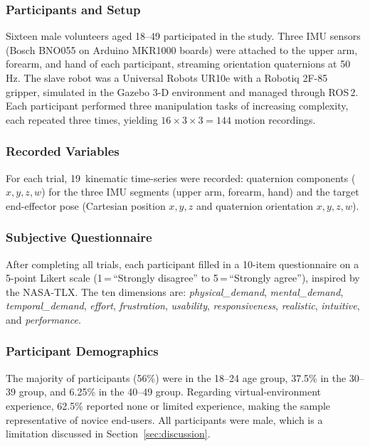 \subsubsection{Participants and Setup}

Sixteen male volunteers aged 18--49 participated in the study. Three IMU sensors (Bosch BNO055 on Arduino MKR1000 boards) were attached to the upper arm, forearm, and hand of each participant, streaming orientation quaternions at 50\,Hz. The slave robot was a Universal Robots UR10e with a Robotiq 2F-85 gripper, simulated in the Gazebo 3-D environment and managed through ROS\,2. Each participant performed three manipulation tasks of increasing complexity, each repeated three times, yielding $16 \times 3 \times 3 = 144$ motion recordings.

\subsubsection{Recorded Variables}

For each trial, 19~kinematic time-series were recorded: quaternion components ($x, y, z, w$) for the three IMU segments (upper arm, forearm, hand) and the target end-effector pose (Cartesian position $x, y, z$ and quaternion orientation $x, y, z, w$).

\subsubsection{Subjective Questionnaire}

After completing all trials, each participant filled in a 10-item questionnaire on a 5-point Likert scale (1\,=\,``Strongly disagree'' to 5\,=\,``Strongly agree''), inspired by the NASA-TLX. The ten dimensions are: \textit{physical\_demand}, \textit{mental\_demand}, \textit{temporal\_demand}, \textit{effort}, \textit{frustration}, \textit{usability}, \textit{responsiveness}, \textit{realistic}, \textit{intuitive}, and \textit{performance}.

\subsubsection{Participant Demographics}

The majority of participants (56\%) were in the 18--24 age group, 37.5\% in the 30--39 group, and 6.25\% in the 40--49 group. Regarding virtual-environment experience, 62.5\% reported none or limited experience, making the sample representative of novice end-users. All participants were male, which is a limitation discussed in Section~\ref{sec:discussion}.

